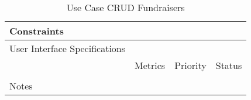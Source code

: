 \begin{table}[H]
\begin{tabularx}{\linewidth}{|l|X|X|X|}
    \hline Constraints                   & \multicolumn{3}{l|}{}                                                                                 \\

    \hline User Interface Specifications & \multicolumn{3}{l|}{}                                                                                 \\

    \hline \multirow{2}{*}{}             & Metrics                                                                           & Priority & Status \\
    \cline{2-4}                          &                                                                                   &          &        \\
    \hline Notes                         & \multicolumn{3}{l|}{}                                                                                 \\
    \hline
  \end{tabularx}
  \caption{Use Case CRUD Fundraisers}
  \label{tab:use_case_fundraisers_crud}
\end{table}




